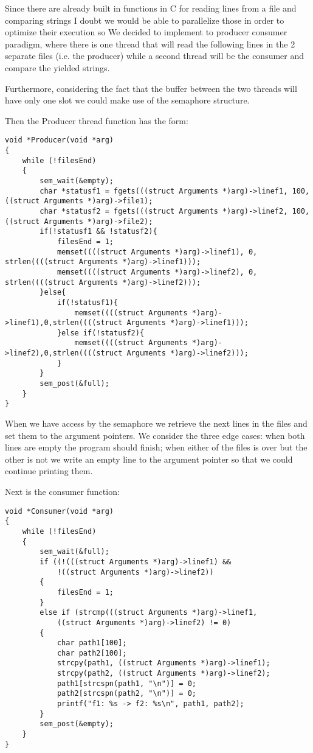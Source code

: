 \documentclass[a4paper,11pt]{article}
\begin{document}
Since there are already built in functions in C for reading lines from a file and comparing strings I doubt we would be able to parallelize those in order to optimize their execution so We decided to implement to producer consumer paradigm, where there is one thread that will read the following lines in the 2 separate files (i.e. the producer) while a second thread will be the consumer and compare the yielded strings.

Furthermore, considering the fact that the buffer between the two threads will have only one slot we could make use of the semaphore structure.

Then the Producer thread function has the form:

\begin{verbatim}
void *Producer(void *arg)
{
    while (!filesEnd)
    {
        sem_wait(&empty);
        char *statusf1 = fgets(((struct Arguments *)arg)->linef1, 100, ((struct Arguments *)arg)->file1);
        char *statusf2 = fgets(((struct Arguments *)arg)->linef2, 100, ((struct Arguments *)arg)->file2);
        if(!statusf1 && !statusf2){
            filesEnd = 1;
            memset((((struct Arguments *)arg)->linef1), 0, strlen((((struct Arguments *)arg)->linef1)));
            memset((((struct Arguments *)arg)->linef2), 0, strlen((((struct Arguments *)arg)->linef2)));
        }else{
            if(!statusf1){
                memset((((struct Arguments *)arg)->linef1),0,strlen((((struct Arguments *)arg)->linef1)));
            }else if(!statusf2){
                memset((((struct Arguments *)arg)->linef2),0,strlen((((struct Arguments *)arg)->linef2)));
            }
        }
        sem_post(&full);
    }
}
\end{verbatim}
When we have access by the semaphore we retrieve the next lines in the files and set them to the argument pointers. We consider the three edge cases: when both lines are empty the program should finish; when either of the files is over but the other is not we write an empty line to the argument pointer so that we could continue printing them.

Next is the consumer function:

\begin{verbatim}
void *Consumer(void *arg)
{
    while (!filesEnd)
    {
        sem_wait(&full);
        if ((!(((struct Arguments *)arg)->linef1) &&
            !((struct Arguments *)arg)->linef2))
        {
            filesEnd = 1;
        }
        else if (strcmp(((struct Arguments *)arg)->linef1, 
            ((struct Arguments *)arg)->linef2) != 0)
        {
            char path1[100];
            char path2[100];
            strcpy(path1, ((struct Arguments *)arg)->linef1);
            strcpy(path2, ((struct Arguments *)arg)->linef2);
            path1[strcspn(path1, "\n")] = 0;
            path2[strcspn(path2, "\n")] = 0;
            printf("f1: %s -> f2: %s\n", path1, path2);
        }
        sem_post(&empty);
    }
}
\end{verbatim}
\end{document}
